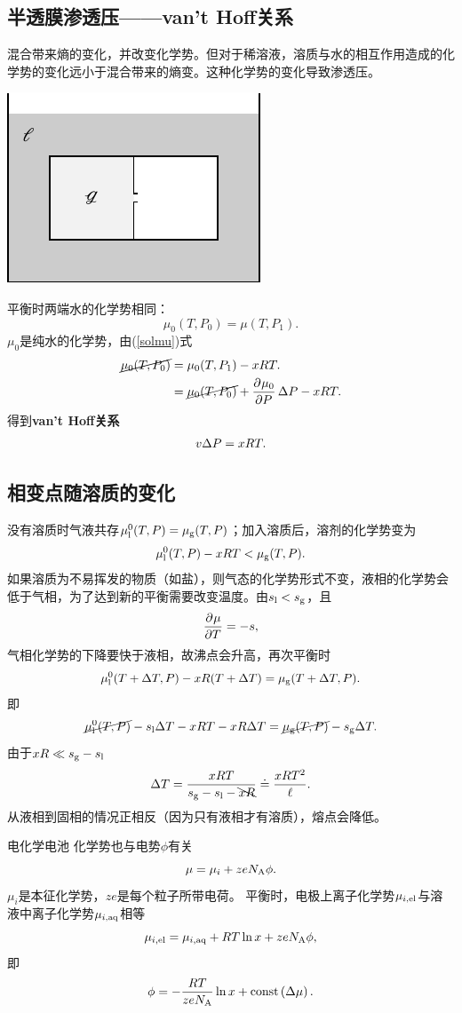\subsection*{半透膜渗透压——van't Hoff关系}
混合带来熵的变化，并改变化学势。但对于稀溶液，溶质与水的相互作用造成的化学势的变化远小于混合带来的熵变。这种化学势的变化导致渗透压。
\begin{center}
	\includegraphics[page=5]{figures/tikz/layouts.pdf}
\end{center}
平衡时两端水的化学势相同：
\[\mu_0(T,P_0)=\mu(T,P_1).\]
$\mu_0$是纯水的化学势，由(\ref{solmu})式
\begin{align*}
	\cancel{\mu_0(T,P_0)} & =\mu_0(T,P_1)-xRT.                            \\
	                      & =\cancel{\mu_0(T,P_0)}+\frac{\partial^{{}}\mu_0}{\partial{P}^{{}}}\,\Delta P-xRT.
\end{align*}
得到\textbf{van't Hoff关系}
\begin{align}
	v\Delta P=xRT.
\end{align}
\subsection*{相变点随溶质的变化}
没有溶质时气液共存$\mu^0_{\mathrm{l}}(T,P)=\mu_{\mathrm{g}}(T,P)$；加入溶质后，溶剂的化学势变为
\[\mu^0_{\mathrm{l}}(T,P)-xRT<\mu_{\mathrm{g}}(T,P).\]
如果溶质为不易挥发的物质（如盐），则气态的化学势形式不变，液相的化学势会低于气相，为了达到新的平衡需要改变温度。由$s_{\mathrm{l}}<s_{\mathrm{g}}$，且
\[\frac{\partial^{{}}\mu}{\partial{T}^{{}}}=-s,\]
气相化学势的下降要快于液相，故沸点会升高，再次平衡时
\[\mu^0_{\mathrm{l}}(T+\Delta T,P)-xR(T+\Delta T)=\mu_{\mathrm{g}}(T+\Delta T,P).\]
即
\[\cancel{\mu^0_{\mathrm{l}}(T,P)}-s_{\mathrm{l}}\Delta T-xRT-xR\Delta T=\cancel{\mu_{\mathrm{g}}(T,P)}-s_{\mathrm{g}}\Delta T.\]
由于$xR\ll s_{\mathrm{g}}-s_{\mathrm{l}}$
\begin{align}
	\Delta T=\frac{xRT}{s_{\mathrm{g}}-s_{\mathrm{l}}-\bcancel{xR}}\doteq\frac{xRT^2}\ell.
\end{align}
从液相到固相的情况正相反（因为只有液相才有溶质），熔点会降低。
\begin{example}
	{电化学电池}{}
	化学势也与电势$\phi$有关
	\[\mu=\mu_i+zeN_{\mathrm A}\phi.\]
	$\mu_i$是本征化学势，$ze$是每个粒子所带电荷。
	 平衡时，电极上离子化学势$\mu_{i,\mathrm{el}}$与溶液中离子化学势$\mu_{i,\mathrm{aq}}$相等
	\[\mu_{i,\mathrm{el}}=\mu_{i,\mathrm{aq}}+RT\ln x+zeN_{\mathrm A}\phi,\]
	即
	\[\phi=-\frac{RT}{zeN_{\mathrm A}}\ln x+\text{const}\left(\Delta\mu\right).\]
\end{example}

